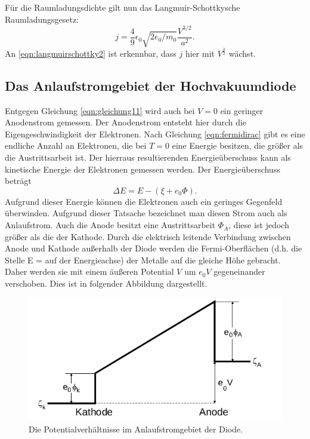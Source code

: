 \noindent
Für die Raumladungsdichte gilt nun das Langmuir-Schottkysche Raumladungsgesetz:
\begin{equation}
  j = \frac{4}{9} \epsilon_0 \sqrt{2 e_0/m_0} \frac{V^{3/2}}{a^2}.
  \label{eqn:langmuirschottky2}
\end{equation}
An \eqref{eqn:langmuirschottky2} ist erkennbar, dass $j$ hier mit
$V^{\frac{3}{2}}$ wächst.

\subsection{Das Anlaufstromgebiet der Hochvakuumdiode}
Entgegen Gleichung \eqref{eqn:gleichung11} wird auch bei $V = 0$ ein
geringer Anodenstrom gemessen. Der Anodenstrom entsteht hier durch die
Eigengeschwindigkeit der Elektronen. Nach Gleichung \eqref{eqn:fermidirac} gibt
es eine endliche Anzahl an Elektronen, die bei $T = 0$ eine Energie besitzen,
die größer als die Austrittsarbeit ist. Der hierraus resultierenden
Energieüberschuss kann als kinetische Energie der Elektronen gemessen werden.
Der Energieüberschuss beträgt
\begin{equation}
  \Delta E = E - (\xi + e_0 \Phi).
  \label{eqn:energieübersch}
\end{equation}
Aufgrund dieser Energie können die Elektronen auch ein geringes Gegenfeld
überwinden. Aufgrund dieser Tatsache bezeichnet man diesen Strom auch als
Anlaufstrom. Auch die Anode besitzt eine Austrittsarbeit $\Phi_A$, diese ist
jedoch größer als die der Kathode. Durch die elektrisch leitende Verbindung
zwischen Anode und Kathode außerhalb der Diode werden die Fermi-Oberflächen
(d.h. die Stelle E = \xi auf der Energieachse) der Metalle auf die gleiche Höhe
gebracht. Daher werden sie mit einem äußeren Potential $V$ um $e_0 V$
gegeneinander verschoben. Dies ist in folgender Abbildung dargestellt.
\begin{figure}[H]
  \centering
  \includegraphics[scale=0.5]{content/anlaufstrompot.png}
  \caption{Die Potentialverhältnisse im Anlaufstromgebiet der Diode.}
  \label{fig:anlaufstrompot}
\end{figure}
